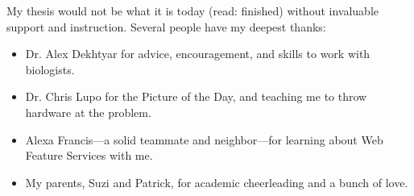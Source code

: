 \noindent
My thesis would not be what it is today (read: finished) without invaluable support and instruction. Several people have my deepest thanks:
\begin{itemize}
    \item Dr. Alex Dekhtyar for advice, encouragement, and skills to work with biologists.
    \item Dr. Chris Lupo for the Picture of the Day, and teaching me to throw hardware at the problem.
    \item Alexa Francis---a solid teammate and neighbor---for learning about Web Feature Services with me.
    \item My parents, Suzi and Patrick, for academic cheerleading and a bunch of love.
\end{itemize}